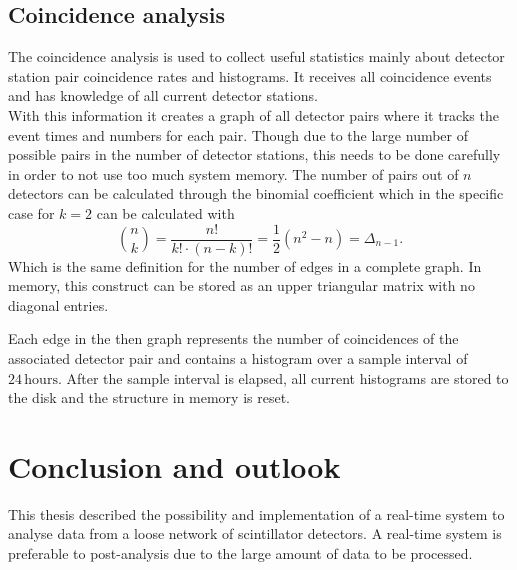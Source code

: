 \documentclass[abstract,toc,los,lof,english,10pt,glossary,acronyms]{jluthesis}
\begin{document}
\subsection{Coincidence analysis}\label{subsec:coincidence-s}
The coincidence analysis is used to collect useful statistics mainly about detector station pair coincidence rates and histograms. It receives all coincidence events and has knowledge of all current detector stations. \\
With this information it creates a graph of all detector pairs where it tracks the event times and numbers for each pair. Though due to the large number of possible pairs in the number of detector stations, this needs to be done carefully in order to not use too much system memory. The number of pairs out of $n$ detectors can be calculated through the binomial coefficient which in the specific case for $k = 2$ can be calculated with
\begin{equation}
	{n \choose k} = \frac{n!}{k!\cdot\left(n - k\right)!} = \frac{1}{2}\left(n^2 - n\right) = \Delta_{n-1}.
\end{equation}
Which is the same definition for the number of edges in a complete graph. In memory, this construct can be stored as an upper triangular matrix with no diagonal entries.

Each edge in the then graph represents the number of coincidences of the associated detector pair and contains a histogram over a sample interval of $24\,\text{hours}$. After the sample interval is elapsed, all current histograms are stored to the disk and the structure in memory is reset.
\clearpage
\section{Conclusion and outlook}
This thesis described the possibility and implementation of a real-time system to analyse data from a loose network of scintillator detectors. A real-time system is preferable to post-analysis due to the large amount of data to be processed.
\clearpage

\makeback
\end{document}
